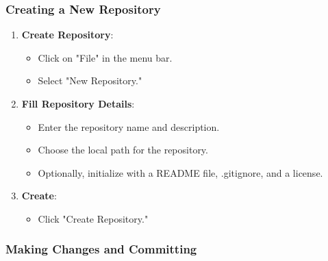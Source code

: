 \subsubsection{Creating a New Repository}

\begin{enumerate}
    \item \textbf{Create Repository}:
    \begin{itemize}
        \item Click on "File" in the menu bar.
        \item Select "New Repository."
    \end{itemize}

    \item \textbf{Fill Repository Details}:
    \begin{itemize}
        \item Enter the repository name and description.
        \item Choose the local path for the repository.
        \item Optionally, initialize with a README file, .gitignore, and a license.
    \end{itemize}

    \item \textbf{Create}:
    \begin{itemize}
        \item Click "Create Repository."
    \end{itemize}
\end{enumerate}

\subsubsection{Making Changes and Committing}

